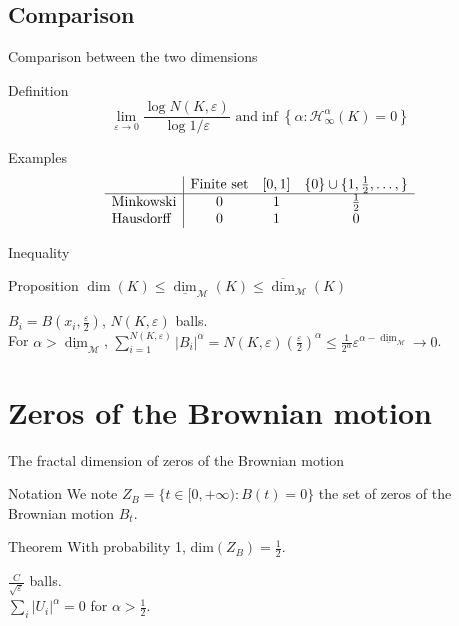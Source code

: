 \documentclass[t]{beamer}
\begin{document}
\subsection{Comparison}
\begin{frame}{Comparison between the two dimensions}
    \begin{alertblock}{Definition}
    $$
    \lim_{\varepsilon \to 0} \frac{\log N(K, \varepsilon)}{\log 1/\varepsilon}\mbox{ and} \inf\left\{ \alpha:\mathcal{H}^\alpha_\infty (K) = 0 \right\}
    $$
    \end{alertblock}
    \begin{exampleblock}{Examples}
        $$
        \begin{array}{l| c c c c}
            & \mbox{Finite set} &[0, 1] & \{0\}\cup \{1, \frac{1}{2}, \dots,\} \\
            \hline
            \mbox{Minkowski} & 0 & 1 & \frac{1}{2}\\
            \mbox{Hausdorff} & 0 & 1 & 0\\
        \end{array}
        $$
    \end{exampleblock}
\end{frame}
\begin{frame}{Inequality}
    \begin{block}{Proposition}
        $\dim(K) \le \underline{\dim}_\mathcal{M}(K) \le \overline{\dim}_\mathcal{M}(K)$
    \end{block}
    $B_i = B(x_i, \frac{\varepsilon}{2})$, $N(K, \varepsilon)$ balls.\\
    For $\alpha > \underline{\dim}_\mathcal{M}$, $\sum_{i=1}^{N(K, \varepsilon)} |B_i|^\alpha = N(K, \varepsilon)\left( \frac{\varepsilon}{2}\right)^{\alpha} \le \frac{1}{2^\alpha} \varepsilon^{\alpha-\underline{\dim}_\mathcal{M}} \to 0$.
\end{frame}


\section{Zeros of the Brownian motion}
\begin{frame}{The fractal dimension of zeros of the Brownian motion}
    \begin{exampleblock}{Notation}
        We note $Z_B = \{t \in [0, +\infty) : B(t) = 0\}$ the set of zeros of the Brownian motion $B_t$.
    \end{exampleblock}
    \begin{block}{Theorem}
        With probability 1, dim$(Z_B) = \frac{1}{2}$.
    \end{block}
    $\frac{C}{\sqrt{\varepsilon}}$ balls.\\
    $\sum_{i} |U_i|^\alpha = 0$ for $\alpha > \frac{1}{2}$.

\end{frame}
\end{document}
